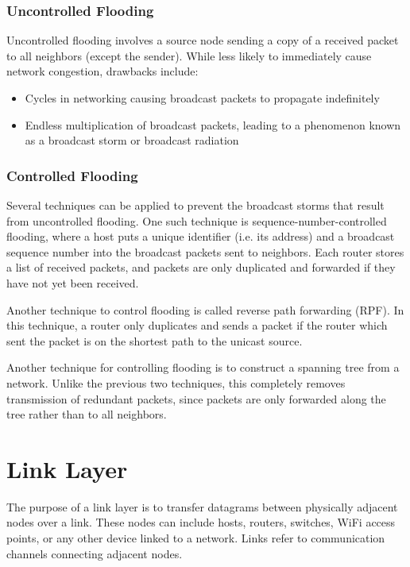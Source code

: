 \documentclass[12pt,titlepage]{article}
\begin{document}
      \subsubsection{Uncontrolled Flooding}
        Uncontrolled flooding involves a source node sending a copy of a received packet to all neighbors (except the sender). While less likely to
        immediately cause network congestion, drawbacks include:
        \begin{itemize}
          \item Cycles in networking causing broadcast packets to propagate indefinitely
          \item Endless multiplication of broadcast packets, leading to a phenomenon known as a broadcast storm or broadcast radiation
        \end{itemize}

      \subsubsection{Controlled Flooding}
        Several techniques can be applied to prevent the broadcast storms that result from uncontrolled flooding. One such technique is
        sequence-number-controlled flooding, where a host puts a unique identifier (i.e. its address) and a broadcast sequence number
        into the broadcast packets sent to neighbors. Each router stores a list of received packets, and packets are only duplicated and
        forwarded if they have not yet been received.

        Another technique to control flooding is called reverse path forwarding (RPF). In this technique, a router only duplicates and sends
        a packet if the router which sent the packet is on the shortest path to the unicast source.

        Another technique for controlling flooding is to construct a spanning tree from a network. Unlike the previous two techniques, this
        completely removes transmission of redundant packets, since packets are only forwarded along the tree rather than to all neighbors.

  \newpage

  \section{Link Layer}
    The purpose of a link layer is to transfer datagrams between physically adjacent nodes over a link. These nodes can include hosts, routers, switches,
    WiFi access points, or any other device linked to a network. Links refer to communication channels connecting adjacent nodes.
\end{document}
